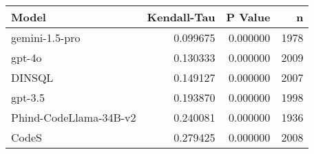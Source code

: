 \begin{tabular}{lrrr}
\toprule
Model & Kendall-Tau & P Value & n \\
\midrule
gemini-1.5-pro & 0.099675 & 0.000000 & 1978 \\
gpt-4o & 0.130333 & 0.000000 & 2009 \\
DINSQL & 0.149127 & 0.000000 & 2007 \\
gpt-3.5 & 0.193870 & 0.000000 & 1998 \\
Phind-CodeLlama-34B-v2 & 0.240081 & 0.000000 & 1936 \\
CodeS & 0.279425 & 0.000000 & 2008 \\
\bottomrule
\end{tabular}
